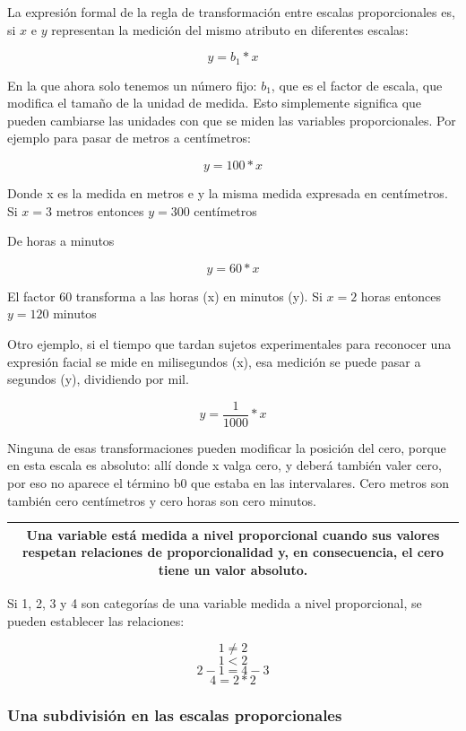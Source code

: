 \documentclass[]{book}
\begin{document}
La expresión formal de la regla de transformación entre escalas proporcionales es, si \(x\) e \(y\) representan la medición del mismo atributo en diferentes escalas:

\[y = b_1 * x\]

En la que ahora solo tenemos un número fijo: \(b_1\), que es el factor de escala, que modifica el tamaño de la unidad de medida. Esto simplemente significa que pueden cambiarse las unidades con que se miden las variables proporcionales. Por ejemplo para pasar de metros a centímetros:

\[y = 100 * x\]

Donde x es la medida en metros e y la misma medida expresada en centímetros. Si \(x=3\) metros entonces \(y=300\) centímetros

De horas a minutos

\[y = 60 * x\]

El factor 60 transforma a las horas (x) en minutos (y). Si \(x=2\) horas entonces \(y=120\) minutos

Otro ejemplo, si el tiempo que tardan sujetos experimentales para reconocer una expresión facial se mide en milisegundos (x), esa medición se puede pasar a segundos (y), dividiendo por mil.

\[y=\dfrac{1}{1000}*x\]

Ninguna de esas transformaciones pueden modificar la posición del cero, porque en esta escala es absoluto: allí donde x valga cero, y deberá también valer cero, por eso no aparece el término b0 que estaba en las intervalares. Cero metros son también cero centímetros y cero horas son cero minutos.

\begin{longtable}[]{@{}c@{}}
\toprule
\endhead
\begin{minipage}[t]{0.97\columnwidth}\centering
Una variable está medida a nivel \textbf{proporcional} cuando sus valores respetan relaciones de proporcionalidad y, en consecuencia, el cero tiene un valor absoluto.\strut
\end{minipage}\tabularnewline
\bottomrule
\end{longtable}

Si 1, 2, 3 y 4 son categorías de una variable medida a nivel proporcional, se pueden establecer las relaciones:

\[1 \neq 2\]
\[1 < 2\]
\[2 - 1 = 4 - 3\]
\[4 = 2 * 2\]

\hypertarget{una-subdivision-en-las-escalas-proporcionales}{%
\subsubsection{Una subdivisión en las escalas proporcionales}\label{una-subdivision-en-las-escalas-proporcionales}}
\end{document}
